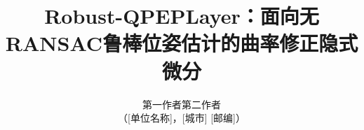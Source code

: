 \documentclass[a4paper,twocolumn,10pt]{ctexart}
\begin{document}
\pagestyle{plain}

\title{\bfseries Robust-QPEPLayer：面向无RANSAC鲁棒位姿估计的曲率修正隐式微分}
\author{ 第一作者\quad 第二作者\\[2pt] （[单位名称]，[城市] [邮编]）}
\date{}
\maketitle

\begin{abstract}

\end{abstract}













\newpage

\end{document}

